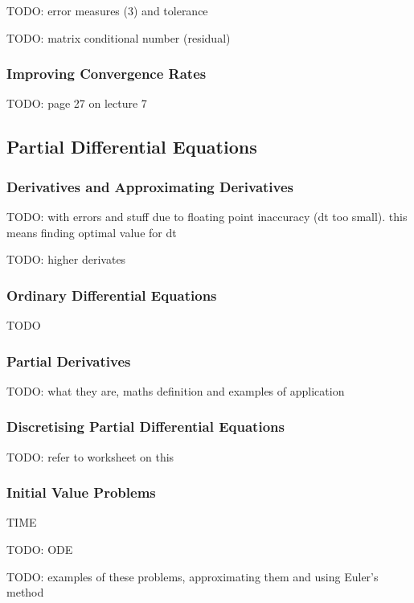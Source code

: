 \documentclass{article}
\begin{document}
TODO: error measures (3) and tolerance

TODO: matrix conditional number (residual)

\subsubsection{Improving Convergence Rates}

TODO: page 27 on lecture 7

\subsection{Partial Differential Equations}

\subsubsection{Derivatives and Approximating Derivatives}

TODO: with errors and stuff  due to floating point inaccuracy (dt too small). this means finding optimal value for dt

TODO: higher derivates

\subsubsection{Ordinary Differential Equations}

TODO

\subsubsection{Partial Derivatives}

TODO: what they are, maths definition and examples of application

\subsubsection{Discretising Partial Differential Equations}

TODO: refer to worksheet on this

\subsubsection{Initial Value Problems}

TIME	

TODO: ODE

TODO: examples of these problems, approximating them and using Euler's method
\end{document}
